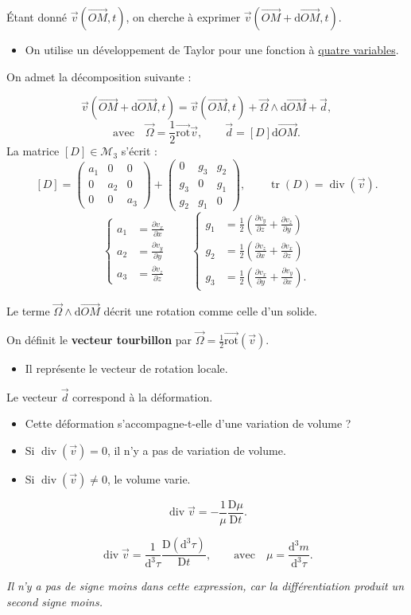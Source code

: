 \documentclass[11pt,a4paper]{article}
\newcommand{\dd}{\mathrm d}
\newcommand{\vv}{\vec v}
\newcommand{\OO}{\vec\Omega}
\newcommand{\OM}{\overrightarrow{OM}}
\newcommand{\rot}{\overrightarrow{\mathrm{rot}}}
\newcommand{\ddiv}{\operatorname{div}}
\newcommand{\Dt}[1]{\frac{\mathrm D #1}{\mathrm D t}}
\newcommand{\pd}[2]{\frac{\partial #1}{\partial #2}}
\begin{document}
Étant donné $\vv(\OM,t)$, on cherche à exprimer $\vv(\OM+\dd\OM,t)$.
\begin{itemize}\item On utilise un développement de Taylor pour une fonction à \underline{quatre variables}.\end{itemize}
\newpage
On admet la décomposition suivante :
\begin{cadre}
\[\vv(\OM+\dd\OM,t)=\vv(\OM,t)+\OO\wedge\dd\OM+\vec d,\]
\[\text{avec}\quad\OO=\frac12\rot\vv,\qquad\vec d=[D]\dd\OM.\]
La matrice $[D]\in\mathcal M_3$ s’écrit :
\[
[D]=\begin{pmatrix}a_1&0&0\\0&a_2&0\\0&0&a_3\end{pmatrix}
+\begin{pmatrix}0&g_3&g_2\\g_3&0&g_1\\g_2&g_1&0\end{pmatrix},
\qquad\operatorname{tr}(D)=\ddiv(\vv).
\]
\[
\left\{\begin{aligned}a_1&=\pd{v_x}{x}\\[4pt]a_2&=\pd{v_y}{y}\\[4pt]a_3&=\pd{v_z}{z}\end{aligned}\right.
\qquad
\left\{\begin{aligned}g_1&=\frac12\left(\pd{v_y}{z}+\pd{v_z}{y}\right)\\[4pt]g_2&=\frac12\left(\pd{v_z}{x}+\pd{v_x}{z}\right)\\[4pt]g_3&=\frac12\left(\pd{v_x}{y}+\pd{v_y}{x}\right).\end{aligned}\right.
\]
\end{cadre}
Le terme $\OO\wedge\dd\OM$ décrit une rotation comme celle d’un solide.

On définit le \textbf{vecteur tourbillon} par $\OO=\frac12\rot(\vv)$.
\begin{itemize}\item Il représente le vecteur de rotation locale.\end{itemize}
Le vecteur $\vec d$ correspond à la déformation.
\begin{itemize}
\item Cette déformation s’accompagne-t-elle d’une variation de volume ?
\item Si $\ddiv(\vv)=0$, il n’y a pas de variation de volume.
\item Si $\ddiv(\vv)\ne0$, le volume varie.
\end{itemize}
\begin{cadre}\[\ddiv\vv=-\frac1\mu\Dt{\mu}.\]\end{cadre}
\begin{cadre}\[\ddiv\vv=\frac1{\dd^3\tau}\Dt{(\dd^3\tau)},\qquad\text{avec}\quad\mu=\frac{\dd^3m}{\dd^3\tau}.\]\end{cadre}
\textit{Il n’y a pas de signe moins dans cette expression, car la différentiation produit un second signe moins.}
\end{document}
